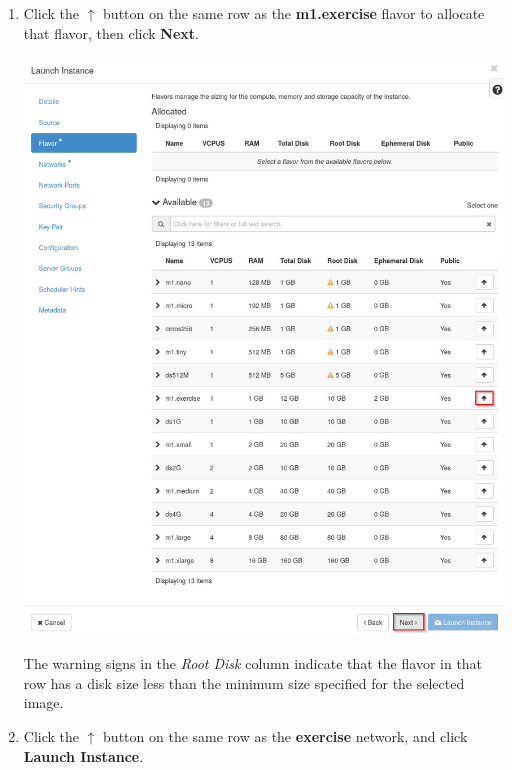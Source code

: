 \documentclass[letterpaper, 12pt]{article}
\begin{document}
\begin{enumerate}
    \item Click the $\uparrow$ button on the same row as the \textbf{m1.exercise} flavor to allocate that flavor, then
    click \textbf{Next}.
    \begin{center}
        \includegraphics[width=\linewidth]{images/part4/step5.png}
    \end{center}

    \begin{notebox}{}
        The warning signs in the \textit{Root Disk} column indicate that the flavor in that row has a disk size less
        than the minimum size specified for the selected image.
    \end{notebox}

    \item Click the $\uparrow$ button on the same row as the \textbf{exercise} network, and click \textbf{Launch
    Instance}.


\end{enumerate}
\end{document}
